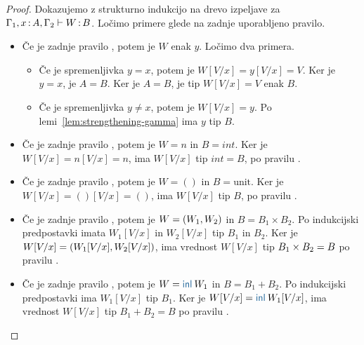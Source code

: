 \begin{proof}
	Dokazujemo z strukturno indukcijo na drevo izpeljave za $\Gamma_1, x \mathinner{:} A, \Gamma_2 \vdash W \mathinner{:} B$.
	Ločimo primere glede na zadnje uporabljeno pravilo.
	
	\begin{itemize}
		\item[\sitem] 
		Če je zadnje pravilo , potem je $W$ enak $y$. Ločimo dva primera.
		\begin{itemize}
			\item Če je spremenljivka $y = x$, potem je $W[V/x] = y[V/x] = V$. Ker je $y = x$, je $A = B$. Ker je $A = B$, je tip $W[V/x] = V$ enak $B$.
			\item Če je spremenljivka $y \neq x$, potem je $W[V/x] = y$. Po lemi~\ref{lem:strengthening-gamma} ima $y$ tip $B$.
		\end{itemize}
		
	
		\item Če je zadnje pravilo , potem je $W=n$ in $B=int$. Ker je $W[V/x] = n[V/x] = n$, ima $W[V/x]$ tip $int = B$, po pravilu .
		
		\item Če je zadnje pravilo , potem je $W=()$ in $B=\text{unit}$. Ker je $W[V/x] = ()[V/x] = ()$, ima $W[V/x]$ tip $B$, po pravilu .
		
		\item Če je zadnje pravilo , potem je $W =( W_1 , W_2 )$ in $B = B_1 \times B_2$. Po indukcijski predpostavki imata $W_1[V/x]$ in $W_2[V/x]$ tip $B_1$ in $B_2$.
		Ker je $W[V/x] = ( W_1[V/x] , W_2[V/x] )$, ima vrednost $W[V/x]$ tip $B_1 \times B_2 = B$ po pravilu .
		
		\item Če je zadnje pravilo , potem je $W = \tminl{W_1}$ in $B = B_1 + B_2$. Po indukcijski predpostavki ima $W_1[V/x]$ tip $B_1$.
		Ker je $W[V/x] = \tminl{W_1[V/x]}$, ima vrednost $W[V/x]$ tip $B_1 + B_2 = B$ po pravilu .
		

\end{itemize}
\end{proof}
